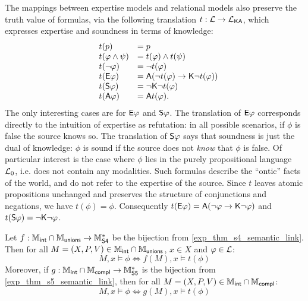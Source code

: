 The mappings between expertise models and relational models also preserve the
truth value of formulas, via the following translation $t: \cL \to
\cLKA$, which expresses expertise and soundness in terms of knowledge:
\[
\begin{array}{lll}
 &t(p) &= p \\
 &t(\phi \land \psi) &= t(\phi) \land t(\psi) \\
 &t(\neg\phi) &= \neg t(\phi) \\
 &t(\E\phi) &= \A(\neg t(\phi) \limplies \K\neg t(\phi)) \\
 &t(\S\phi) &= \neg\K\neg t(\phi) \\
 &t(\A\phi) &= \A t(\phi).
\end{array}
\]
The only interesting cases are for $\E\phi$ and $\S\phi$. The
translation of $\E\phi$ corresponds directly to the intuition of
expertise as refutation: in all possible scenarios, if $\phi$ is false
the source knows so. The translation of $\S\phi$ says that soundness is
just the dual of knowledge: $\phi$ is sound if the source does not \emph{know}
that $\phi$ is false. Of particular interest is the case where $\phi$ lies in
the purely propositional language $\cLzero$, i.e. does not contain any
modalities. Such formulas describe the ``ontic'' facts of the world, and
do not refer to the expertise of the source. Since $t$ leaves atomic
propositions unchanged and preserves the structure of conjunctions and
negations, we have $t(\phi) = \phi$. Consequently $t(\E\phi) = \A(\neg\phi
\limplies \K\neg\phi)$ and $t(\S\phi) = \neg\K\neg\phi$.

\begin{theorem}
\label{exp_thm_s4s5_translation}

    Let $f: \Mint \cap \Munions \to \Msfour$ be the bijection from
    \cref{exp_thm_s4_semantic_link}. Then for all $M = (X, P, V) \in \Mint
    \cap \Munions$, $x \in X$ and $\phi \in \cL$:
    \begin{equation}
        \label{exp_eqn_s4s5_1}
        M, x \models \phi \iff f(M), x \models t(\phi)
    \end{equation}
    Moreover, if $g: \Mint \cap \Mcompl \to \Msfive$ is the bijection from
    \cref{exp_thm_s5_semantic_link}, then for all $M = (X, P, V) \in
    \Mint \cap \Mcompl$:
    \begin{equation}
        \label{exp_eqn_s4s5_2}
        M, x \models \phi \iff g(M), x \models t(\phi)
    \end{equation}
\end{theorem}

